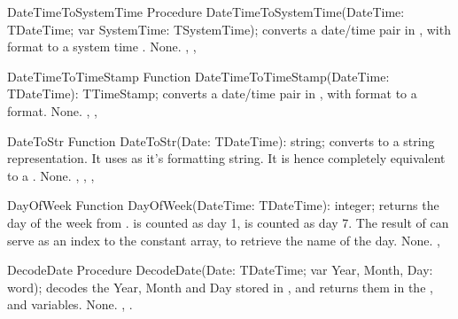 
 
\begin{procedure}{DateTimeToSystemTime}
\Declaration
Procedure DateTimeToSystemTime(DateTime: TDateTime; var SystemTime: TSystemTime);
\Description
{} converts a date/time pair in , with
 format to a system time .
\Errors
None.
\SeeAlso
{}, ,
\end{procedure}



\begin{function}{DateTimeToTimeStamp}
\Declaration
Function DateTimeToTimeStamp(DateTime: TDateTime): TTimeStamp;
\Description
{} converts a date/time pair in , with
 format to a  format.
\Errors
None.
\SeeAlso
{}, ,
\end{function}



\begin{function}{DateToStr}
\Declaration
Function DateToStr(Date: TDateTime): string;
\Description
{} converts  to a string representation. It uses
 as it's formatting string. It is hence completely
equivalent to a .
\Errors
None.
\SeeAlso
{}, , ,
\end{function}



 
\begin{function}{DayOfWeek}
\Declaration
Function DayOfWeek(DateTime: TDateTime): integer;
\Description
{} returns the day of the week from .
 is counted as day 1,  is counted as 
day 7. The result of  can serve as an index to 
the  constant array, to retrieve the name of 
the day.
\Errors
None.
\SeeAlso
{}, 
\end{function}




\begin{procedure}{DecodeDate}
\Declaration
Procedure DecodeDate(Date: TDateTime; var Year, Month, Day: word);
\Description
{} decodes the Year, Month and Day stored in ,
and returns them in the ,  and  variables.
\Errors
None.
\SeeAlso
{}, .
\end{procedure}

